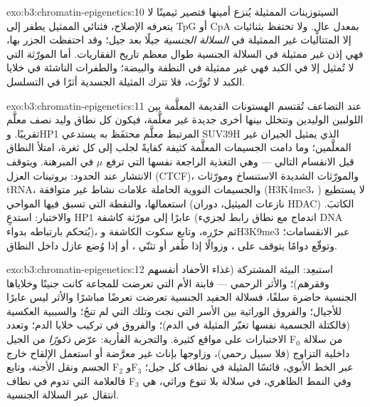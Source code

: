 \begin{solution}{exo:b3:chromatin-epigenetics:10}
السيتوزينات الممثيلة يُنزع أمينها فتصير ثيمينًا لا يتعرفه الإصلاح،
فثنائي  الممثيل يطفر إلى TpG أو CpA بمعدل عالٍ. ولا تحتفظ بثنائيات 
إلا المتتاليات غير الممثيلة في \emph{السلالة الجنسية} جيلًا بعد جيل؛
وقد احتفظت الجزر بها، فهي إذن غير ممثيلة في السلالة الجنسية طوال
معظم تاريخ الفقاريات. أما المورّثة التي لا تُمثيل إلا في الكبد فهي
غير ممثيلة في النطفة والبيضة؛ والطفرات الناشئة في خلايا الكبد لا
تُورَّث، فلا تترك المثيلة الجسدية أثرًا في التسلسل.
\end{solution}

\begin{solution}{exo:b3:chromatin-epigenetics:11}
عند التضاعف تُقتسم الهستونات القديمة المعلَّمة بين اللولبين الوليدين
وتتخلل بينها أخرى جديدة غير معلَّمة، فيكون كل نطاق وليد نصف معلَّم
تقريبًا. وHP1 المرتبط  معلَّم محتفَظ به يستدعي SUV39H الذي
يمثيل الجيران غير المعلَّمين؛ وما دامت الجسيمات المعلَّمة كثيفة كفايةً
لجلب  إلى كل ثغرة، امتلأ النطاق قبل الانقسام التالي --- وهي
التغذية الراجعة نفسها التي ترفع $\mu$ في المبرهنة. ويتوقف الانتشار
عند الحدود: بروتينات العزل (CTCF)، والمورّثات الشديدة الاستنساخ
ومورّثات tRNA، والجسيمات النووية الحاملة علامات نشاط غير متوافقة
(H3K4me3، ) لا يستطيع  استعمالها، والنقطة التي تسبق
فيها المواحي (نازعات الميثيل، دوران HDAC) الكاتبَ. والاختبار: استدعِ
HP1 عابرًا إلى مورّثة كاشفة (اندماج مع نطاق رابط لجزيء DNA يُتحكم
بارتباطه بدواء)، ثم حرّره، وتابع سكوت الكاشفة وH3K9me3 عبر
الانقسامات؛ وتوقّع دوامًا يتوقف على ، وزوالًا إذا طُفر 
أو تثنّي ، أو إذا وُضع عازل داخل النطاق.
\end{solution}

\begin{solution}{exo:b3:chromatin-epigenetics:12}
استبعِد: البيئة المشتركة (غذاء الأحفاد أنفسهم وفقرهم)؛ والأثر الرحمي
--- فابنة الأم التي تعرضت للمجاعة كانت جنينًا وخلاياها الجنسية
حاضرة سلفًا، فسلالة الحفيد الجنسية تعرضت تعرضًا مباشرًا والأثر ليس
عابرًا للأجيال؛ والفروق الوراثية بين الأسر التي نجت وتلك التي لم
تنجُ؛ والسببية العكسية (فالكتلة الجسمية نفسها تغيّر المثيلة في
الدم)؛ والفروق في تركيب خلايا الدم؛ وتعدد الاختبارات على مواقع 
كثيرة. والتجربة الفأرية: عرّض \emph{ذكورًا} من الجيل F$_0$ من سلالة
داخلية التزاوج (فلا سبيل رحمي)، وزاوجها بإناث غير معرَّضة أو استعمل
الإلقاح خارج الجسم ونقل الأجنة، وتابع F$_2$ وF$_3$ عبر الخط الأبوي،
قائسًا المثيلة في نطاف كل جيل؛ فالعلامة التي تدوم في نطاف F$_3$ وفي
النمط الظاهري، في سلالة بلا تنوع وراثي، هي انتقال عبر السلالة
الجنسية.
\end{solution}

